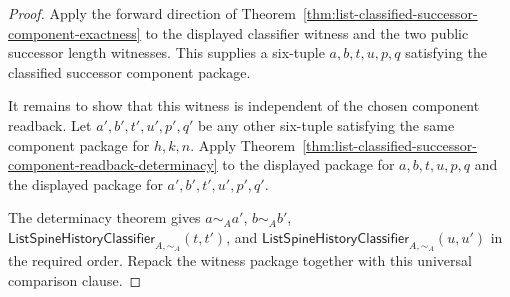 \begin{proof}
Apply the forward direction of
Theorem~\ref{thm:list-classified-successor-component-exactness} to the
displayed classifier witness and the two public successor length witnesses.
This supplies a six-tuple $a,b,t,u,p,q$ satisfying the classified successor
component package.

It remains to show that this witness is independent of the chosen component
readback. Let $a',b',t',u',p',q'$ be any other six-tuple satisfying the same
component package for $h,k,n$. Apply
Theorem~\ref{thm:list-classified-successor-component-readback-determinacy} to
the displayed package for $a,b,t,u,p,q$ and the displayed package for
$a',b',t',u',p',q'$.

The determinacy theorem gives $a\sim_A a'$, $b\sim_A b'$,
$\mathsf{ListSpineHistoryClassifier}_{A,\sim_A}(t,t')$, and
$\mathsf{ListSpineHistoryClassifier}_{A,\sim_A}(u,u')$ in the required order.
Repack the witness package together with this universal comparison clause.
\end{proof}

